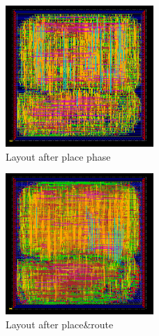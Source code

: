 \begin{figure}[H]
	\centering
	\includegraphics[width=0.5\textwidth]{sec4/images/place.png}
	\caption{Layout after place phase}
	\label{fig:place}
\end{figure}

\begin{figure}[H]
	\centering
	\includegraphics[width=0.5\textwidth]{sec4/images/route.png}
	\caption{Layout after place\&route}
	\label{fig:route}
\end{figure}